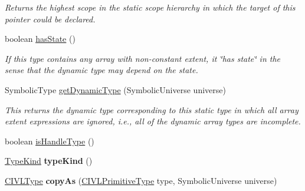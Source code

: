 \begin{DoxyCompactItemize}
\begin{DoxyCompactList}\small\item\em Returns the highest scope in the static scope hierarchy in which the target of this pointer could be declared. \end{DoxyCompactList}\item 
boolean \hyperlink{classedu_1_1udel_1_1cis_1_1vsl_1_1civl_1_1model_1_1common_1_1type_1_1CommonPointerType_ad13444cbb2f441bec8f7176f0ec9ac52}{has\+State} ()
\begin{DoxyCompactList}\small\item\em If this type contains any array with non-\/constant extent, it \char`\"{}has state\char`\"{} in the sense that the dynamic type may depend on the state. \end{DoxyCompactList}\item 
Symbolic\+Type \hyperlink{classedu_1_1udel_1_1cis_1_1vsl_1_1civl_1_1model_1_1common_1_1type_1_1CommonPointerType_ade472c99a084bbbb6a890a9e7223d8e9}{get\+Dynamic\+Type} (Symbolic\+Universe universe)
\begin{DoxyCompactList}\small\item\em This returns the dynamic type corresponding to this static type in which all array extent expressions are ignored, i.\+e., all of the dynamic array types are incomplete. \end{DoxyCompactList}\item 
boolean \hyperlink{classedu_1_1udel_1_1cis_1_1vsl_1_1civl_1_1model_1_1common_1_1type_1_1CommonPointerType_a0566fe18800958a0b214fda5925dcd70}{is\+Handle\+Type} ()
\item 
\hypertarget{classedu_1_1udel_1_1cis_1_1vsl_1_1civl_1_1model_1_1common_1_1type_1_1CommonPointerType_a9cbdf3a201c739ed1bf53e520d15099d}{}\hyperlink{enumedu_1_1udel_1_1cis_1_1vsl_1_1civl_1_1model_1_1IF_1_1type_1_1CIVLType_1_1TypeKind}{Type\+Kind} {\bfseries type\+Kind} ()\label{classedu_1_1udel_1_1cis_1_1vsl_1_1civl_1_1model_1_1common_1_1type_1_1CommonPointerType_a9cbdf3a201c739ed1bf53e520d15099d}

\item 
\hypertarget{classedu_1_1udel_1_1cis_1_1vsl_1_1civl_1_1model_1_1common_1_1type_1_1CommonPointerType_acad760d867f0f5c7df21b0ca84c78cc6}{}\hyperlink{interfaceedu_1_1udel_1_1cis_1_1vsl_1_1civl_1_1model_1_1IF_1_1type_1_1CIVLType}{C\+I\+V\+L\+Type} {\bfseries copy\+As} (\hyperlink{interfaceedu_1_1udel_1_1cis_1_1vsl_1_1civl_1_1model_1_1IF_1_1type_1_1CIVLPrimitiveType}{C\+I\+V\+L\+Primitive\+Type} type, Symbolic\+Universe universe)\label{classedu_1_1udel_1_1cis_1_1vsl_1_1civl_1_1model_1_1common_1_1type_1_1CommonPointerType_acad760d867f0f5c7df21b0ca84c78cc6}


\end{DoxyCompactItemize}
